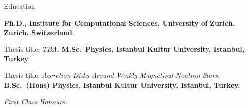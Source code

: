 \begin{rubric}{Education}

%
	\textbf{Ph.D., Institute for Computational Sciences, University of Zurich, Zurich, Switzerland}.
	\par Thesis title: \emph{TBA.}
%
\entry*[2011 -- 2014]%
	\textbf{M.Sc.~Physics, Istanbul Kultur University, Istanbul, Turkey}\par
	Thesis title: \emph{Accretion Disks Around Weakly Magnetized Neutron Stars}.
%
\entry*[2007 -- 2011]%
	\textbf{B.Sc.~(Hons) Physics, Istanbul Kultur University, Istanbul, Turkey.}\par
	\emph{First Class Honours.}
%
\end{rubric}